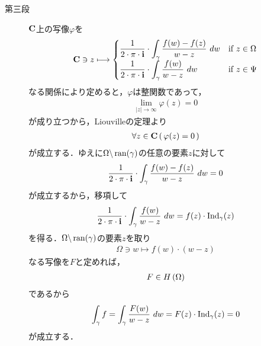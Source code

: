 \begin{sketch}[大雑把]
\begin{description}
			\item[第三段]
				$\mathbf{C}$上の写像$\varphi$を
				\begin{align}
					\mathbf{C} \ni z \longmapsto
					\begin{cases}
						{\displaystyle \frac{1}{2\cdot\pi\cdot\mathbf{i}} \cdot \int_{\gamma} \frac{f(w)-f(z)}{w-z}\ dw} & \mbox{if } z \in \Omega \\
						{\displaystyle \frac{1}{2\cdot\pi\cdot\mathbf{i}} \cdot \int_{\gamma} \frac{f(w)}{w-z}\ dw} & \mbox{if } z \in \Psi
					\end{cases}
				\end{align}
				なる関係により定めると，$\varphi$は整関数であって，
				\begin{align}
					\lim_{|z| \longrightarrow \infty} \varphi(z) = 0 
				\end{align}
				が成り立つから，Liouvilleの定理より
				\begin{align}
					\forall z \in \mathbf{C}\, (\, \varphi(z) = 0\, )
				\end{align}
				が成立する．ゆえに$\Omega \backslash \operatorname*{ran} (\gamma)$の任意の要素$z$に対して
				\begin{align}
					\frac{1}{2\cdot\pi\cdot\mathbf{i}} \cdot \int_{\gamma} \frac{f(w)-f(z)}{w-z}\ dw = 0
				\end{align}
				が成立するから，移項して
				\begin{align}
					\frac{1}{2\cdot\pi\cdot\mathbf{i}} \cdot \int_{\gamma} \frac{f(w)}{w-z}\ dw
					= f(z) \cdot \operatorname{Ind}_{\gamma}(z)
				\end{align}
				を得る．$\Omega \backslash \operatorname*{ran} (\gamma)$の要素$z$を取り
				\begin{align}
					\Omega \ni w \longmapsto f(w) \cdot (w - z)
				\end{align}
				なる写像を$F$と定めれば，
				\begin{align}
					F \in H\left(\Omega\right)
				\end{align}
				であるから
				\begin{align}
					\int_{\gamma} f = \int_{\gamma} \frac{F(w)}{w-z}\ dw = F(z) \cdot \operatorname{Ind}_{\gamma}(z) = 0
				\end{align}
				が成立する．
				\QED
		\end{description}
	\end{sketch}